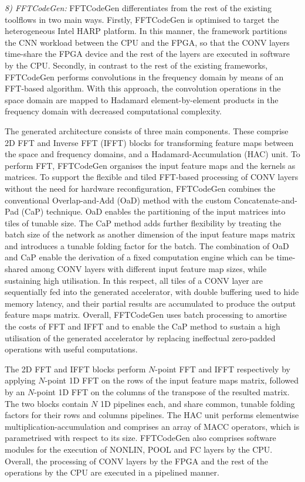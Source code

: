 \documentclass[format=acmsmall, review=false, screen=true]{acmart}
\begin{document}
{\color{black}\textit{8) FFTCodeGen:}
FFTCodeGen differentiates from the rest of the existing toolflows in two main ways. Firstly, FFTCodeGen is optimised to target the heterogeneous Intel HARP platform. In this manner, the framework partitions the CNN workload between the CPU and the FPGA, so that the CONV layers time-share the FPGA device and the rest of the layers are executed in software by the CPU. Secondly, in contrast to the rest of the existing frameworks, FFTCodeGen performs convolutions in the frequency domain by means of an FFT-based algorithm. With this approach, the convolution operations in the space domain are mapped to Hadamard element-by-element products in the frequency domain with decreased computational complexity.

The generated architecture consists of three main components. These comprise 2D FFT and Inverse FFT (IFFT) blocks for transforming feature maps between the space and frequency domains, and a Hadamard-Accumulation (HAC) unit. To perform FFT, FFTCodeGen organises the input feature maps and the kernels as matrices. To support the flexible and tiled FFT-based processing of CONV layers without the need for hardware reconfiguration, FFTCodeGen combines the conventional Overlap-and-Add (OaD) method with the custom Concatenate-and-Pad (CaP) technique. OaD enables the partitioning of the input matrices into tiles of tunable size. The CaP method adds further flexibility by treating the batch size of the network as another dimension of the input feature maps matrix and introduces a tunable folding factor for the batch. The combination of OaD and CaP enable the derivation of a fixed computation engine which can be time-shared among CONV layers with different input feature map sizes, while sustaining high utilisation. In this respect, all tiles of a CONV layer are sequentially fed into the generated accelerator, with double buffering used to hide memory latency, and their partial results are accumulated to produce the output feature maps matrix. Overall, FFTCodeGen uses batch processing to amortise the costs of FFT and IFFT and to enable the CaP method to sustain a high utilisation of the generated accelerator by replacing ineffectual zero-padded operations with useful computations. 

The 2D FFT and IFFT blocks perform $N$-point FFT and IFFT respectively by applying $N$-point 1D FFT on the rows of the input feature maps matrix, followed by an $N$-point 1D FFT on the columns of the transpose of the resulted matrix. The two blocks contain $N$ 1D pipelines each, and share common, tunable folding factors for their rows and columns pipelines. The HAC unit performs elementwise multiplication-accumulation and comprises an array of MACC operators, which is parametrised with respect to its size. FFTCodeGen also comprises software modules for the execution of NONLIN, POOL and FC layers by the CPU. Overall, the processing of CONV layers by the FPGA and the rest of the operations by the CPU are executed in a pipelined manner.


}
\end{document}
